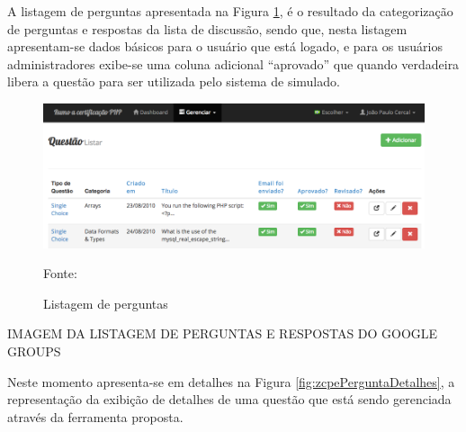 \FloatBarrier 	%

A listagem de perguntas apresentada na Figura \ref{fig:zcpePerguntaListagem}, é
o resultado da categorização de perguntas e respostas da lista de discussão,
sendo que, nesta listagem apresentam-se dados básicos para o usuário que está logado, e para os usuários
administradores exibe-se uma coluna adicional ``aprovado'' que quando verdadeira
libera a questão para ser utilizada pelo sistema de simulado.

\begin{figure}[h!tb]
	\caption{Listagem de perguntas}
	\label{fig:zcpePerguntaListagem}

	\centering
	\includegraphics[width=\textwidth]{images/resultados/zcpe-pergunta-listagem.png}

	\centering
	\footnotesize Fonte: \fonteOAutor
\end{figure}

\FloatBarrier 	%


IMAGEM DA LISTAGEM DE PERGUNTAS E RESPOSTAS DO GOOGLE GROUPS 

Neste momento apresenta-se em detalhes na Figura \ref{fig:zcpePerguntaDetalhes},
a representação da exibição de detalhes de uma questão que está sendo gerenciada
através da ferramenta proposta.

